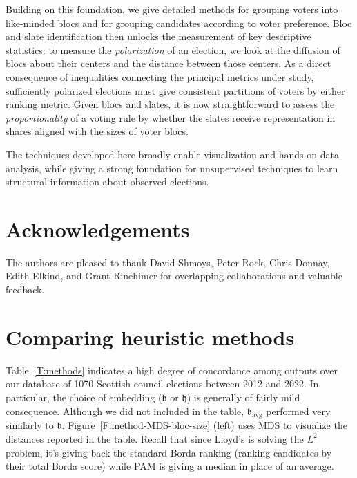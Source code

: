\documentclass{amsart}
\newcommand{\bb}{\mathfrak{b}}
\newcommand{\hh}{\mathfrak{h}}
\theoremstyle{plain}
\theoremstyle{definition}
\theoremstyle{remark}
\begin{document}
Building on this foundation, we give detailed methods for grouping voters into like-minded blocs and for grouping candidates according to voter preference.  Bloc and slate identification then unlocks the measurement of key descriptive statistics:  to measure the {\em polarization} of an election, we look at the diffusion of blocs about their centers and the distance between those centers.  As a direct consequence of inequalities connecting the principal metrics under study, sufficiently polarized elections must give consistent partitions of voters by either ranking metric.  Given blocs and slates, it is now straightforward to assess the {\em proportionality} of a voting rule by whether the slates receive representation in shares aligned with the sizes of voter blocs.  

The techniques developed here broadly enable visualization and hands-on data analysis, while giving a strong foundation for unsupervised techniques to learn structural information about observed elections.  

\vspace{1in}

\section*{Acknowledgements}
The authors are pleased to thank David Shmoys, Peter Rock, Chris Donnay, Edith Elkind, and Grant Rinehimer for overlapping collaborations and valuable feedback.

%
%


\clearpage




\clearpage
\appendix

\section{Comparing heuristic methods}\label{app:compare}

Table~\ref{T:methods} indicates a high degree of concordance among outputs over our database of 1070 Scottish council elections between 2012 and 2022. In particular, the choice of embedding ($\bb$ or $\hh$) is generally of fairly mild consequence.  Although we did not included in the table, $\bb_{\text{avg}}$ performed very similarly to $\bb$.  Figure~\ref{F:method-MDS-bloc-size} (left) uses MDS to visualize the distances reported in the table.  Recall that since Lloyd's is solving the $L^2$ problem, it's giving back the standard Borda ranking (ranking candidates by their total Borda score) while PAM is giving a median in place of an average.
\end{document}
